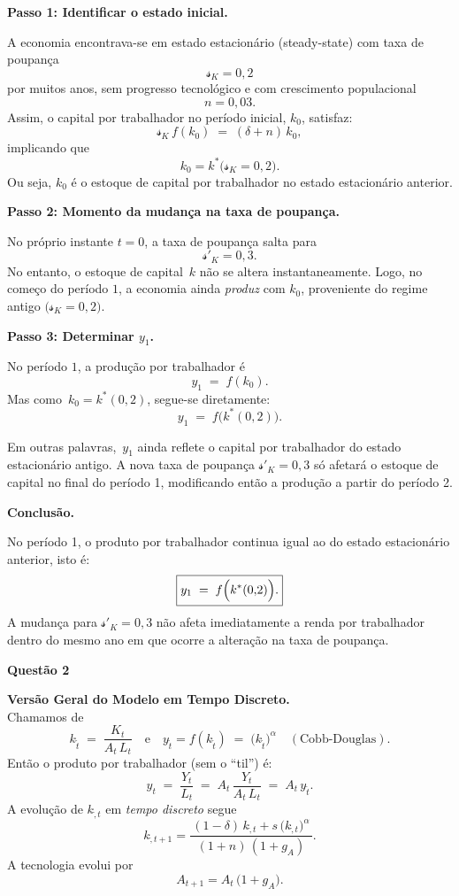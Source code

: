 \documentclass[a4paper,12pt]{article}[abntex2]
\begin{document}
\textbf{Passo 1: Identificar o estado inicial.}

A economia encontrava-se em estado estacionário (steady-state) com taxa de poupança 
\[
\mathcal{s}_K = 0{,}2
\]
por muitos anos, sem progresso tecnológico e com crescimento populacional 
\[
n = 0{,}03.
\]
Assim, o capital por trabalhador no período inicial, \(k_0\), satisfaz:
\[
\mathcal{s}_K \, f(k_0) \;=\; (\delta + n) \, k_0,
\]
implicando que 
\[
k_0 = k^*\bigl(\mathcal{s}_K = 0{,}2\bigr).
\]
Ou seja, \(k_0\) é o estoque de capital por trabalhador no estado estacionário anterior.


\textbf{Passo 2: Momento da mudança na taxa de poupança.}

No próprio instante \(t=0\), a taxa de poupança salta para 
\[
\mathcal{s}'_K = 0{,}3.
\]
No entanto, o estoque de capital \(\,k\) não se altera instantaneamente. Logo, no começo do período \(1\), a economia ainda \emph{produz} com \(k_0\), proveniente do regime antigo \(\bigl(\mathcal{s}_K=0{,}2\bigr)\).


\textbf{Passo 3: Determinar \(y_1\).}

No período \(1\), a produção por trabalhador é
\[
y_1 \;=\; f(k_0).
\]
Mas como \(\,k_0 = k^*(0{,}2)\), segue-se diretamente:
\[
y_1 \;=\; f\bigl(k^*(0{,}2)\bigr).
\]

Em outras palavras, \(\,y_1\) ainda reflete o capital por trabalhador do estado estacionário antigo. A nova taxa de poupança \(\mathcal{s}'_K = 0{,}3\) só afetará o estoque de capital no final do período 1, modificando então a produção a partir do período 2.


\textbf{Conclusão.}

No período 1, o produto por trabalhador continua igual ao do estado estacionário anterior, isto é:
\[
\boxed{
y_1 \;=\; f\Bigl(k^*(0{,}2)\Bigr).
}
\]
A mudança para \(\mathcal{s}'_K = 0{,}3\) não afeta imediatamente a renda por trabalhador dentro do mesmo ano em que ocorre a alteração na taxa de poupança.

\textbf{Questão 2}

\textbf{Versão Geral do Modelo em Tempo Discreto.}\\
Chamamos de 
\[
k_{\tilde{t}} \;=\; \frac{K_t}{A_t \, L_t}
\quad\text{e}\quad
y_{\tilde{t}} = f(k_{\tilde{t}}) \;=\; \bigl(k_{\tilde{t}}\bigr)^\alpha
\quad (\text{Cobb-Douglas}).
\]
Então o produto por trabalhador (sem o ``til'') é:
\[
y_t 
\;=\; 
\frac{Y_t}{L_t}
\;=\; 
A_t \,\frac{Y_t}{A_t\,L_t}
\;=\; 
A_t \, y_{\tilde{t}}.
\]
A evolução de \(k_{\tilde,t}\) em \emph{tempo discreto} segue
\[
k_{\tilde,t+1}
=
\frac{\, (1-\delta)\,k_{\tilde,t} + s \, \bigl(k_{\tilde,t}\bigr)^\alpha \,}{
(1+n)\,(1+g_A)
}.
\]
A tecnologia evolui por
\[
A_{t+1} = A_t \,\bigl(1+g_A\bigr).
\]
\end{document}

